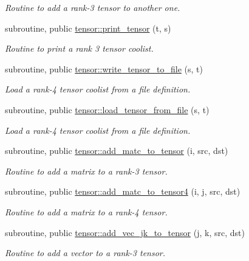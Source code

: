 \begin{DoxyCompactItemize}
\begin{DoxyCompactList}\small\item\em Routine to add a rank-\/3 tensor to another one. \end{DoxyCompactList}\item 
subroutine, public \hyperlink{namespacetensor_a1fbaf180beb7fe8ab83ade2f576db80f}{tensor\+::print\+\_\+tensor} (t, s)
\begin{DoxyCompactList}\small\item\em Routine to print a rank 3 tensor coolist. \end{DoxyCompactList}\item 
subroutine, public \hyperlink{namespacetensor_ab9cef88cb38333ed2c063cdf08f28060}{tensor\+::write\+\_\+tensor\+\_\+to\+\_\+file} (s, t)
\begin{DoxyCompactList}\small\item\em Load a rank-\/4 tensor coolist from a file definition. \end{DoxyCompactList}\item 
subroutine, public \hyperlink{namespacetensor_ac4c6ebce7aee73aebac2514e45f7cc78}{tensor\+::load\+\_\+tensor\+\_\+from\+\_\+file} (s, t)
\begin{DoxyCompactList}\small\item\em Load a rank-\/4 tensor coolist from a file definition. \end{DoxyCompactList}\item 
subroutine, public \hyperlink{namespacetensor_a4c63a1dd16bf751220f016b41bdaa78c}{tensor\+::add\+\_\+matc\+\_\+to\+\_\+tensor} (i, src, dst)
\begin{DoxyCompactList}\small\item\em Routine to add a matrix to a rank-\/3 tensor. \end{DoxyCompactList}\item 
subroutine, public \hyperlink{namespacetensor_ab32e3f9d0aab15d2fa34dc3e509ee8bf}{tensor\+::add\+\_\+matc\+\_\+to\+\_\+tensor4} (i, j, src, dst)
\begin{DoxyCompactList}\small\item\em Routine to add a matrix to a rank-\/4 tensor. \end{DoxyCompactList}\item 
subroutine, public \hyperlink{namespacetensor_aaa98410f224bc3dfb96cd7031f56e916}{tensor\+::add\+\_\+vec\+\_\+jk\+\_\+to\+\_\+tensor} (j, k, src, dst)
\begin{DoxyCompactList}\small\item\em Routine to add a vector to a rank-\/3 tensor. \end{DoxyCompactList}\item 

\end{DoxyCompactItemize}
